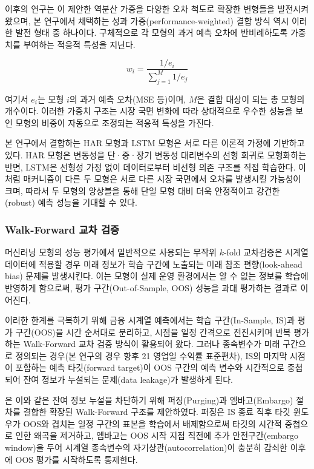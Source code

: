 \documentclass{article}
\begin{document}
이후의 연구는 \citet{bates1969combination}이 제안한 역분산 가중을 다양한 오차 척도로 확장한 변형들을 발전시켜 왔으며\citep{timmermann2006forecast}, 본 연구에서 채택하는 성과 가중(performance-weighted) 결합 방식 역시 이러한 발전 형태 중 하나이다. 구체적으로 각 모형의 과거 예측 오차에 반비례하도록 가중치를 부여하는 적응적 특성을 지닌다.

\begin{equation}
w_i = \frac{1/e_i}{\sum_{j=1}^{M} 1/e_j}
\label{eq:perf_weight_general}
\end{equation}

여기서 $e_i$는 모형 $i$의 과거 예측 오차(MSE 등)이며, $M$은 결합 대상이 되는 총 모형의 개수이다. 이러한 가중치 구조는 시장 국면 변화에 따라 상대적으로 우수한 성능을 보인 모형의 비중이 자동으로 조정되는 적응적 특성을 가진다.

본 연구에서 결합하는 HAR 모형과 LSTM 모형은 서로 다른 이론적 가정에 기반하고 있다. HAR 모형은 변동성을 단·중·장기 변동성 대리변수의 선형 회귀로 모형화하는 반면, LSTM은 선형성 가정 없이 데이터로부터 비선형 의존 구조를 직접 학습한다. 이처럼 매커니즘이 다른 두 모형은 서로 다른 시장 국면에서 오차를 발생시킬 가능성이 크며, 따라서 두 모형의 앙상블을 통해 단일 모형 대비 더욱 안정적이고 강건한(robust) 예측 성능을 기대할 수 있다.

\subsubsection{Walk-Forward 교차 검증}
\label{subsubsec:walk_forward_review}

머신러닝 모형의 성능 평가에서 일반적으로 사용되는 무작위 $k$-fold 교차검증은 시계열 데이터에 적용할 경우 미래 정보가 학습 구간에 노출되는 미래 참조 편향(look-ahead bias) 문제를 발생시킨다. 이는 모형이 실제 운영 환경에서는 알 수 없는 정보를 학습에 반영하게 함으로써, 평가 구간(Out-of-Sample, OOS) 성능을 과대 평가하는 결과로 이어진다.

이러한 한계를 극복하기 위해 금융 시계열 예측에서는 학습 구간(In-Sample, IS)과 평가 구간(OOS)을 시간 순서대로 분리하고, 시점을 일정 간격으로 전진시키며 반복 평가하는 Walk-Forward 교차 검증 방식이 활용되어 왔다. 그러나 종속변수가 미래 구간으로 정의되는 경우(본 연구의 경우 향후 21 영업일 수익률 표준편차), IS의 마지막 시점이 포함하는 예측 타깃(forward target)이 OOS 구간의 예측 변수와 시간적으로 중첩되어 잔여 정보가 누설되는 문제(data leakage)가 발생하게 된다.

\citet{lopezdeprado2018}은 이와 같은 잔여 정보 누설을 차단하기 위해 퍼징(Purging)과 엠바고(Embargo) 절차를 결합한 확장된 Walk-Forward 구조를 제안하였다. 퍼징은 IS 종료 직후 타깃 윈도우가 OOS와 겹치는 일정 구간의 표본을 학습에서 배제함으로써 타깃의 시간적 중첩으로 인한 왜곡을 제거하고, 엠바고는 OOS 시작 지점 직전에 추가 안전구간(embargo window)을 두어 시계열 종속변수의 자기상관(autocorrelation)이 충분히 감쇠한 이후에 OOS 평가를 시작하도록 통제한다.
\end{document}
